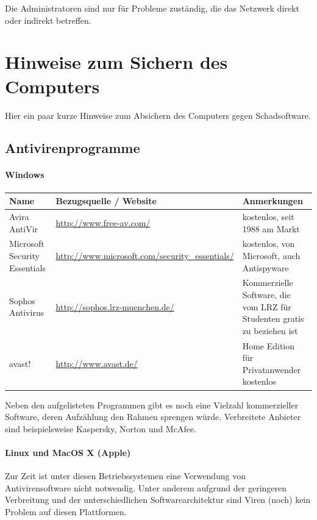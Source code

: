 \documentclass[a4paper,12pt,draft]{scrartcl}
\begin{document}
Die Administratoren sind nur für Probleme zuständig, die das Netzwerk direkt oder indirekt betreffen. 

\newpage
\section*{Hinweise zum Sichern des Computers}

Hier ein paar kurze Hinweise zum Absichern des Computers gegen Schadsoftware.

\subsection*{Antivirenprogramme}
\paragraph*{Windows}
\begin{center}
  \begin{tabularx}{\linewidth}{|p{.2\linewidth}XX|}
    \hline
    Name & Bezugsquelle / Website & Anmerkungen\\
    \hline \hline
    Avira AntiVir & \url{http://www.free-av.com/} & kostenlos, seit 1988 am Markt\\
    \hline
    Microsoft Security Essentials & \url{http://www.microsoft.com/security\_essentials/} & kostenlos, von Microsoft, auch Antispyware\\
    \hline
    Sophos Antivirus & \url{http://sophos.lrz-muenchen.de/} & Kommerzielle Software, die vom LRZ für Studenten gratis zu beziehen ist\\
    \hline
    avast! & \url{http://www.avast.de/} & Home Edition für Privatanwender kostenlos\\
    \hline
  \end{tabularx}
\end{center}

Neben den aufgelisteten Programmen gibt es noch eine Vielzahl kommerzieller Software, deren Aufzählung den Rahmen sprengen würde. Verbreitete Anbieter sind beispielsweise Kaspersky, Norton und McAfee.

\paragraph*{Linux und MacOS X (Apple)}

Zur Zeit ist unter diesen Betriebssystemen eine Verwendung von Antivirensoftware nicht notwendig. Unter anderem aufgrund der geringeren Verbreitung und der unterschiedlichen Softwarearchitektur sind Viren (noch) kein Problem auf diesen Plattformen.
\end{document}
